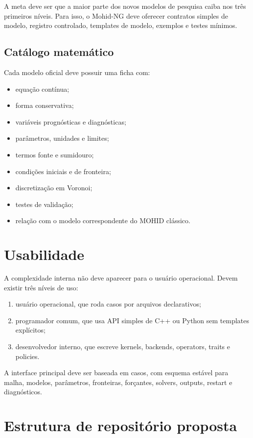 \documentclass[11pt,a4paper]{article}
\begin{document}
A meta deve ser que a maior parte dos novos modelos de pesquisa caiba nos tr\^es primeiros n\'iveis. Para isso, o Mohid-NG deve oferecer contratos simples de modelo, registro controlado, templates de modelo, exemplos e testes m\'inimos.

\subsection{Cat\'alogo matem\'atico}

Cada modelo oficial deve possuir uma ficha com:
\begin{itemize}
  \item equa\c{c}\~ao cont\'inua;
  \item forma conservativa;
  \item vari\'aveis progn\'osticas e diagn\'osticas;
  \item par\^ametros, unidades e limites;
  \item termos fonte e sumidouro;
  \item condi\c{c}\~oes iniciais e de fronteira;
  \item discretiza\c{c}\~ao em Voronoi;
  \item testes de valida\c{c}\~ao;
  \item rela\c{c}\~ao com o modelo correspondente do MOHID cl\'assico.
\end{itemize}

\section{Usabilidade}

A complexidade interna n\~ao deve aparecer para o usu\'ario operacional. Devem existir tr\^es n\'iveis de uso:
\begin{enumerate}
  \item usu\'ario operacional, que roda casos por arquivos declarativos;
  \item programador comum, que usa API simples de C++ ou Python sem templates expl\'icitos;
  \item desenvolvedor interno, que escreve kernels, backends, operators, traits e policies.
\end{enumerate}

A interface principal deve ser baseada em casos, com esquema est\'avel para malha, modelos, par\^ametros, fronteiras, for\c{c}antes, solvers, outputs, restart e diagn\'osticos.

\section{Estrutura de reposit\'orio proposta}
\end{document}
